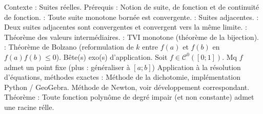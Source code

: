 \markdownRendererDocumentBegin
{}\markdownRendererInterblockSeparator
{}Contexte : Suites réelles.\markdownRendererInterblockSeparator
{}Prérequis : Notion de suite, de fonction et de continuité de fonction.\markdownRendererInterblockSeparator
{}\markdownRendererSectionBegin
{}\markdownRendererInterblockSeparator
{}\shortcutProposition{} : Toute suite monotone bornée est convergente.\markdownRendererInterblockSeparator
{}\shortcutDefinition{} : Suites adjacentes.\markdownRendererInterblockSeparator
{}\shortcutTheoreme{} : Deux suites adjacentes sont convergentes et convergent vers la même limite.\markdownRendererInterblockSeparator
{}
\markdownRendererSectionEnd \markdownRendererSectionBegin
{}\markdownRendererInterblockSeparator
{}\shortcutTheoreme{} : Théorème des valeurs intermédiaires.\markdownRendererInterblockSeparator
{}\shortcutTheoreme{} : TVI monotone (théorème de la bijection).\markdownRendererInterblockSeparator
{}\shortcutCorollaire{} : Théorème de Bolzano (reformulation de $k$ entre $f(a)$ et $f(b)$ en $f(a)f(b) \leq 0$).\markdownRendererInterblockSeparator
{}
\markdownRendererSectionEnd \markdownRendererSectionBegin
{}\markdownRendererInterblockSeparator
{}\markdownRendererOlBeginTight
{}Bête(s) exo(s) d'application.\markdownRendererOlItemEnd 
{}Soit $f \in \mathscr C^0([0;1])$. Mq $f$ admet un point fixe (plus : généraliser à $[a;b]$)\markdownRendererOlItemEnd 
{}Application à la résolution d'équations, méthodes exactes :\markdownRendererInterblockSeparator
{}\markdownRendererUlBeginTight
\markdownRendererUlItem Méthode de la dichotomie, implémentation Python / GeoGebra.\markdownRendererUlItemEnd 
\markdownRendererUlItem Méthode de Newton, voir développement correspondant.\markdownRendererUlItemEnd 
\markdownRendererUlEndTight \markdownRendererOlItemEnd 
{}Théorème : Toute fonction polynôme de degré impair (et non constante) admet une racine rélle.\markdownRendererOlItemEnd 
\markdownRendererOlEndTight 
\markdownRendererSectionEnd \markdownRendererDocumentEnd